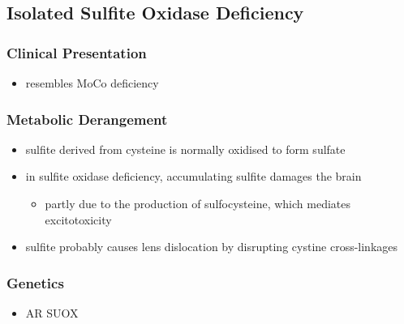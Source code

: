 \documentclass{scrartcl}
\begin{document}
\subsection{Isolated Sulfite Oxidase Deficiency}
\label{sec:org9c227dd}
\subsubsection{Clinical Presentation}
\label{sec:orged58382}
\begin{itemize}
\item resembles MoCo deficiency
\end{itemize}
\subsubsection{Metabolic Derangement}
\label{sec:org0a51fb9}
\begin{itemize}
\item sulfite derived from cysteine is normally oxidised to form
sulfate
\item in sulfite oxidase deficiency, accumulating sulfite damages the brain
\begin{itemize}
\item partly due to the production of sulfocysteine, which
mediates excitotoxicity
\end{itemize}
\item sulfite probably causes lens dislocation by disrupting cystine
cross-linkages
\end{itemize}
\subsubsection{Genetics}
\label{sec:org7ac5833}
\begin{itemize}
\item AR SUOX
\end{itemize}
\end{document}
